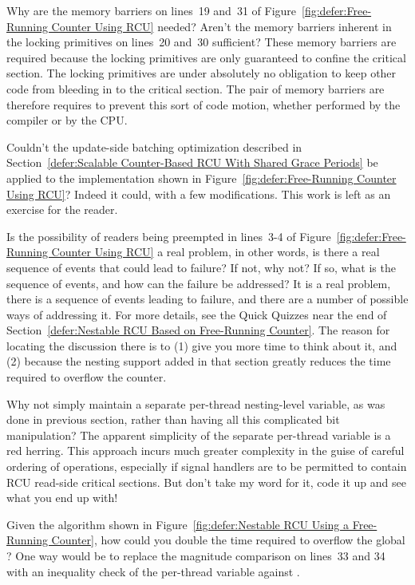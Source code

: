 \begin{enumerate}
\QuickQ{}
	Why are the memory barriers on lines~19 and~31 of
	Figure~\ref{fig:defer:Free-Running Counter Using RCU}
	needed?
	Aren't the memory barriers inherent in the locking
	primitives on lines~20 and~30 sufficient?
\QuickA{}
	These memory barriers are required because the locking
	primitives are only guaranteed to confine the critical
	section.
	The locking primitives are under absolutely no obligation
	to keep other code from bleeding in to the critical section.
	The pair of memory barriers are therefore requires to prevent
	this sort of code motion, whether performed by the compiler
	or by the CPU.

\QuickQ{}
	Couldn't the update-side batching optimization described in
	Section~\ref{defer:Scalable Counter-Based RCU With Shared Grace Periods}
	be applied to the implementation shown in
	Figure~\ref{fig:defer:Free-Running Counter Using RCU}?
\QuickA{}
	Indeed it could, with a few modifications.
	This work is left as an exercise for the reader.

\QuickQ{}
	Is the possibility of readers being preempted in
	lines~3-4 of Figure~\ref{fig:defer:Free-Running Counter Using RCU}
	a real problem, in other words, is there a real sequence
	of events that could lead to failure?
	If not, why not?
	If so, what is the sequence of events, and how can the
	failure be addressed?
\QuickA{}
	It is a real problem, there is a sequence of events leading to
	failure, and there are a number of possible ways of
	addressing it.
	For more details, see the Quick Quizzes near the end of
	Section~\ref{defer:Nestable RCU Based on Free-Running Counter}.
	The reason for locating the discussion there is to (1) give you
	more time to think about it, and (2) because the nesting support
	added in that section greatly reduces the time required to
	overflow the counter.

\QuickQ{}
	Why not simply maintain a separate per-thread nesting-level
	variable, as was done in previous section, rather than having
	all this complicated bit manipulation?
\QuickA{}
	The apparent simplicity of the separate per-thread variable
	is a red herring.
	This approach incurs much greater complexity in the guise
	of careful ordering of operations, especially if signal
	handlers are to be permitted to contain RCU read-side
	critical sections.
	But don't take my word for it, code it up and see what you
	end up with!

\QuickQ{}
	Given the algorithm shown in
	Figure~\ref{fig:defer:Nestable RCU Using a Free-Running Counter},
	how could you double the time required to overflow the global
	?
\QuickA{}
	One way would be to replace the magnitude comparison on
	lines~33 and 34 with an inequality check of the per-thread
	 variable against
	.


\end{enumerate}
